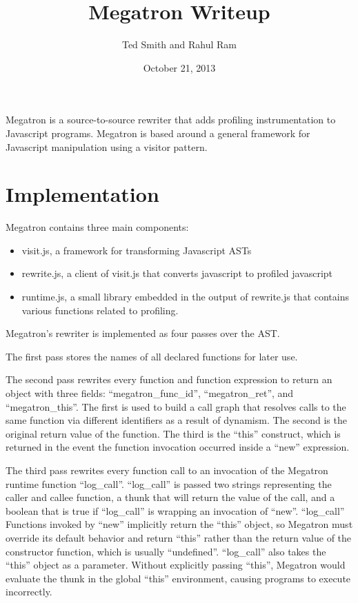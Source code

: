 \documentclass{article}
\begin{document}
\title{Megatron Writeup}
\author{Ted Smith and Rahul Ram}
\date{October 21, 2013}

\maketitle

Megatron is a source-to-source rewriter that adds profiling
instrumentation to Javascript programs.  
Megatron is based around a general framework for Javascript
manipulation using a visitor pattern.

\section{Implementation}

Megatron contains three main components:

\begin{itemize}
\item visit.js, a framework for transforming Javascript ASTs
\item rewrite.js, a client of visit.js that converts javascript to
  profiled javascript
\item runtime.js, a small library embedded in the output of rewrite.js
  that contains various functions related to profiling.
\end{itemize}

Megatron's rewriter is implemented as four passes over the AST.

The first pass stores the names of all declared functions for later
use.

The second pass rewrites every function and function expression to
return an object with three fields: ``megatron\_func\_id'',
``megatron\_ret'', and ``megatron\_this''. The first is used to build a
call graph that resolves calls to the same function via different
identifiers as a result of dynamism. The second is the original return
value of the function. The third is the ``this'' construct, which is
returned in the event the function invocation occurred inside a
``new'' expression.

The third pass rewrites every function call to an invocation of the
Megatron runtime function ``log\_call''. ``log\_call'' is passed two
strings representing the caller and callee function, a thunk that will
return the value of the call, and a boolean that is true if
``log\_call'' is wrapping an invocation of ``new''. ``log\_call''
Functions invoked by ``new'' implicitly return the ``this'' object, so
Megatron must override its default behavior and return ``this'' rather
than the return value of the constructor function, which is usually
``undefined''. ``log\_call'' also takes the ``this'' object as a
parameter. Without explicitly passing ``this'', Megatron would
evaluate the thunk in the global ``this'' environment, causing
programs to execute incorrectly.
\end{document}
